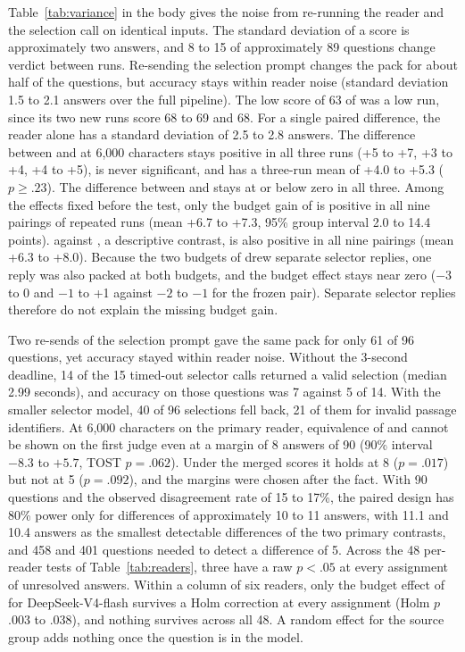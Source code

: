 Table~\ref{tab:variance} in the body gives the noise from re-running the reader and the selection call on identical inputs.
The standard deviation of a score is approximately two answers, and 8 to 15 of approximately 89 questions change verdict between runs.
Re-sending the selection prompt changes the pack for about half of the questions, but accuracy stays within reader noise (standard deviation 1.5 to 2.1 answers over the full pipeline).
The low score of 63 of \setr{} was a low run, since its two new runs score 68 to 69 and 68.
For a single paired difference, the reader alone has a standard deviation of 2.5 to 2.8 answers.
The difference between \lexb{} and \hybrid{} at 6,000 characters stays positive in all three runs (+5 to +7, +3 to +4, +4 to +5), is never significant, and has a three-run mean of +4.0 to +5.3 ($p\ge .23$).
The difference between \lexb{} and \hr{} stays at or below zero in all three.
Among the effects fixed before the test, only the budget gain of \hybrid{} is positive in all nine pairings of repeated runs (mean +6.7 to +7.3, 95\% group interval 2.0 to 14.4 points). \hr{} against \hybrid{}, a descriptive contrast, is also positive in all nine pairings (mean +6.3 to +8.0).
Because the two budgets of \lexb{} drew separate selector replies, one reply was also packed at both budgets, and the budget effect stays near zero ($-3$ to 0 and $-1$ to +1 against $-2$ to $-1$ for the frozen pair).
Separate selector replies therefore do not explain the missing budget gain.

Two re-sends of the selection prompt gave the same pack for only 61 of 96 questions, yet accuracy stayed within reader noise.
Without the 3-second deadline, 14 of the 15 timed-out selector calls returned a valid selection (median 2.99 seconds), and accuracy on those questions was 7 against 5 of 14.
With the smaller selector model, 40 of 96 selections fell back, 21 of them for invalid passage identifiers.
At 6,000 characters on the primary reader, equivalence of \lexb{} and \hr{} cannot be shown on the first judge even at a margin of 8 answers of 90 (90\% interval $-8.3$ to $+5.7$, TOST $p=.062$).
Under the merged scores it holds at 8 ($p=.017$) but not at 5 ($p=.092$), and the margins were chosen after the fact.
With 90 questions and the observed disagreement rate of 15 to 17\%, the paired design has 80\% power only for differences of approximately 10 to 11 answers, with 11.1 and 10.4 answers as the smallest detectable differences of the two primary contrasts, and 458 and 401 questions needed to detect a difference of 5.
Across the 48 per-reader tests of Table~\ref{tab:readers}, three have a raw $p<.05$ at every assignment of unresolved answers.
Within a column of six readers, only the budget effect of \hr{} for DeepSeek-V4-flash survives a Holm correction at every assignment (Holm $p$ .003 to .038), and nothing survives across all 48.
A random effect for the source group adds nothing once the question is in the model.
